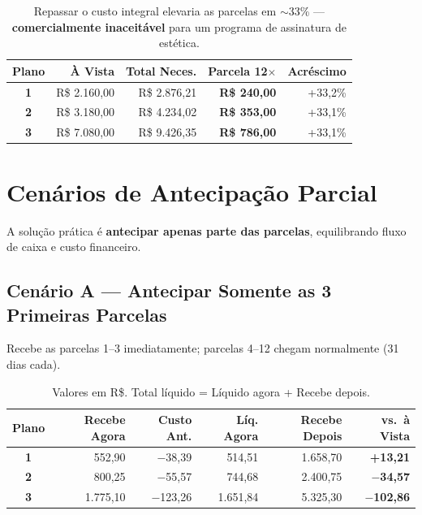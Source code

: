 \documentclass[12pt, a4paper]{article}
\newcommand{\reais}[1]{R\$ #1}
\begin{document}
\begin{table}[H]
    \centering
    \renewcommand{\arraystretch}{1.4}
    \begin{tabularx}{\textwidth}{c r r r r}
        \toprule
        \rowcolor{tableHeader} \textbf{Plano} & \textbf{À Vista} & \textbf{Total Neces.} & \textbf{Parcela 12$\times$} & \textbf{Acréscimo} \\
        \midrule
        \textbf{1} & \reais{2.160,00} & \reais{2.876,21} & \textbf{\reais{240,00}} & +33,2\% \\
        \rowcolor{lightGray}
        \textbf{2} & \reais{3.180,00} & \reais{4.234,02} & \textbf{\reais{353,00}} & +33,1\% \\
        \textbf{3} & \reais{7.080,00} & \reais{9.426,35} & \textbf{\reais{786,00}} & +33,1\% \\
        \bottomrule
    \end{tabularx}
    \caption*{\footnotesize Repassar o custo integral elevaria as parcelas em $\sim$33\% — \textbf{comercialmente inaceitável} para um programa de assinatura de estética.}
\end{table}

\needspace{10cm}

\section{Cenários de Antecipação Parcial}

A solução prática é \textbf{antecipar apenas parte das parcelas}, equilibrando fluxo de caixa e custo financeiro.

\subsection{Cenário A — Antecipar Somente as 3 Primeiras Parcelas}

Recebe as parcelas 1--3 imediatamente; parcelas 4--12 chegam normalmente (31 dias cada).

\begin{table}[H]
    \centering
    \footnotesize
    \renewcommand{\arraystretch}{1.4}
    \begin{tabularx}{\textwidth}{c r r r r r}
        \toprule
        \rowcolor{tableHeader} \textbf{Plano} & \textbf{Recebe Agora} & \textbf{Custo Ant.} & \textbf{Líq. Agora} & \textbf{Recebe Depois} & \textbf{vs.\ à Vista} \\
        \midrule
        \textbf{1} & 552,90 & $-$38,39 & 514,51 & 1.658,70 & \textcolor{successGreen}{\textbf{+13,21}} \\
        \rowcolor{lightGray}
        \textbf{2} & 800,25 & $-$55,57 & 744,68 & 2.400,75 & \textcolor{warningOrange}{\textbf{$-$34,57}} \\
        \textbf{3} & 1.775,10 & $-$123,26 & 1.651,84 & 5.325,30 & \textcolor{warningOrange}{\textbf{$-$102,86}} \\
        \bottomrule
    \end{tabularx}
    \caption*{\footnotesize Valores em R\$. Total líquido = Líquido agora + Recebe depois.}
\end{table}
\end{document}
